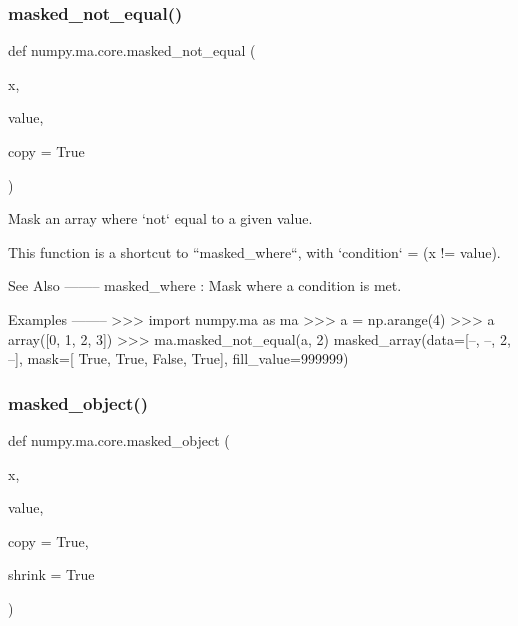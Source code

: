 \subsubsection{\texorpdfstring{masked\+\_\+not\+\_\+equal()}{masked\_not\_equal()}}
{\footnotesize\ttfamily def numpy.\+ma.\+core.\+masked\+\_\+not\+\_\+equal (\begin{DoxyParamCaption}\item[{}]{x,  }\item[{}]{value,  }\item[{}]{copy = {\ttfamily True} }\end{DoxyParamCaption})}

\begin{DoxyVerb}Mask an array where `not` equal to a given value.

This function is a shortcut to ``masked_where``, with
`condition` = (x != value).

See Also
--------
masked_where : Mask where a condition is met.

Examples
--------
>>> import numpy.ma as ma
>>> a = np.arange(4)
>>> a
array([0, 1, 2, 3])
>>> ma.masked_not_equal(a, 2)
masked_array(data=[--, --, 2, --],
             mask=[ True,  True, False,  True],
       fill_value=999999)\end{DoxyVerb}
 \mbox{\label{namespacenumpy_1_1ma_1_1core_a145c2a13a87bc66d481219ca8c1496f7}} 
\subsubsection{\texorpdfstring{masked\+\_\+object()}{masked\_object()}}
{\footnotesize\ttfamily def numpy.\+ma.\+core.\+masked\+\_\+object (\begin{DoxyParamCaption}\item[{}]{x,  }\item[{}]{value,  }\item[{}]{copy = {\ttfamily True},  }\item[{}]{shrink = {\ttfamily True} }\end{DoxyParamCaption})}


